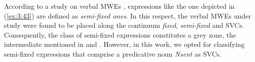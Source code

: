 \documentclass[output=paper]{langsci/langscibook}
\begin{document}
\begin{exe}
\end{exe}

\begin{exe}
\end{exe}



According to a study on verbal MWEs \citep{balibar1995}, expressions
like the one depicted in (\ref{ex:3:43}) are defined as
\textit{semi-fixed \textup{ones}}. In this respect, the
verbal MWEs under study were found to be placed along the continuum
\textit{fixed}, \textit{semi-fixed} and SVCs. Consequently,
the class of semi-fixed expressions constitutes a grey zone, the
intermediate mentioned in  and . However, in this work, we opted for classifying semi-fixed expressions that
comprise a predicative noun \textit{Nsent} as SVCs.
\end{document}
